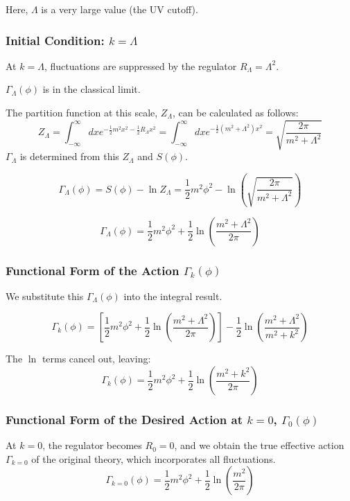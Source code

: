 \documentclass[uplatex,a4j,12pt,dvipdfmx]{jsarticle}
\begin{document}
Here, $\Lambda$ is a very large value (the UV cutoff).

\subsubsection{Initial Condition: $k=\Lambda$}

At $k=\Lambda$, fluctuations are suppressed by the regulator $R_{\Lambda} = \Lambda^{2}$.

$\Gamma_{\Lambda} (\phi)$ is in the classical limit.

The partition function at this scale, $Z_{\Lambda}$, can be calculated as follows:
\[
	Z_{\Lambda} =
	\int^{\infty}_{- \infty} dx e^{ -\frac{1}{2} m^{2} x^{2} - \frac{1}{2} R_{\Lambda} x^{2} }
	=
	\int^{\infty}_{- \infty} dx e^{ -\frac{1}{2} (m^{2} + \Lambda^2) x^{2} }
	=
	\sqrt{ \frac{2 \pi}{m^{2} + \Lambda^2} }
\]
$\Gamma_\Lambda$ is determined from this $Z_\Lambda$ and $S(\phi)$.

\[
	\Gamma_\Lambda(\phi) = S(\phi) - \ln Z_\Lambda = \frac{1}{2}m^2 \phi^2 - \ln \left( \sqrt{\frac{2\pi}{m^2+\Lambda^2}} \right)
\]

\[
	\Gamma_\Lambda(\phi) = \frac{1}{2}m^2 \phi^2 + \frac{1}{2} \ln \left( \frac{m^2+\Lambda^2}{2\pi} \right)
\]

\subsubsection{Functional Form of the Action $\Gamma_{k}(\phi)$}

We substitute this $\Gamma_\Lambda(\phi)$ into the integral result.

\[
	\Gamma_k(\phi) = \left[ \frac{1}{2}m^2 \phi^2 + \frac{1}{2} \ln \left( \frac{m^2+\Lambda^2}{2\pi} \right) \right] - \frac{1}{2} \ln \left( \frac{m^{2} + \Lambda^{2}}{m^{2}+k^{2}} \right)
\]

The $\ln$ terms cancel out, leaving:
\[
	\Gamma_k(\phi) = \frac{1}{2}m^2 \phi^2 + \frac{1}{2} \ln \left( \frac{m^2+k^2}{2\pi} \right)
\]

\subsubsection{Functional Form of the Desired Action at $k=0$, $\Gamma_{0}(\phi)$}

At $k=0$, the regulator becomes $R_0 = 0$,
and we obtain the true effective action $\Gamma_{k=0}$ of the original theory,
which incorporates all fluctuations.
\[
	\Gamma_{k=0}(\phi) = \frac{1}{2}m^2 \phi^2 + \frac{1}{2} \ln \left( \frac{m^2}{2\pi} \right)
\]
\end{document}
